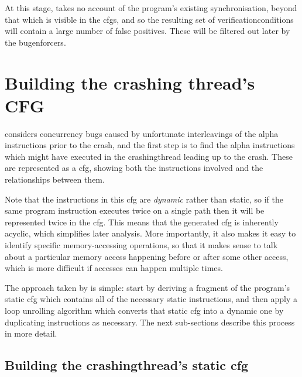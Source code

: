 At this stage, {\technique} takes no account of the program's existing
synchronisation, beyond that which is visible in the \glspl{cfg}, and
so the resulting set of \glspl{verificationcondition} will contain a
large number of false positives.  These will be filtered out later by
the \glspl{bugenforcer}.

\section{Building the crashing thread's CFG}
\label{sect:derive:build_crashing_cfg}

{\Technique} considers concurrency bugs caused by unfortunate
interleavings of the \gls{alpha} instructions prior to the crash, and
the first step is to find the \gls{alpha} instructions which might
have executed in the \gls{crashingthread} leading up to the crash.
These are represented as a \gls{cfg}, showing both the instructions
involved and the relationships between them.

Note that the instructions in this \gls{cfg} are \emph{dynamic} rather
than static, so if the same program instruction executes twice on a
single path then it will be represented twice in the \gls{cfg}.  This
means that the generated \gls{cfg} is inherently acyclic, which
simplifies later analysis.  More importantly, it also makes it easy to
identify specific memory-accessing operations, so that it makes sense
to talk about a particular memory access happening before or after
some other access, which is more difficult if accesses can happen
multiple times.

The approach taken by {\technique} is simple: start by deriving a
fragment of the program's static \gls{cfg} which contains all of the
necessary static instructions, and then apply a loop unrolling
algorithm which converts that static \gls{cfg} into a dynamic one by
duplicating instructions as necessary.  The next sub-sections describe
this process in more detail.

\subsection[Building the \glsentrytext{crashingthread}'s static \glsentrytext{cfg}]{Building the \gls{crashingthread}'s static \gls{cfg}}
\label{sect:derive:build_static_cfg}

